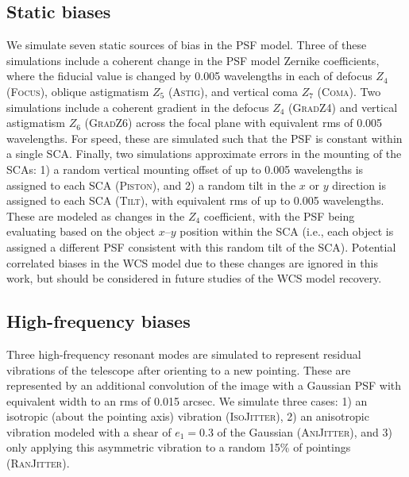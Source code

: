 \documentclass[aps,prd, amsmath,amssymb,superscriptaddress,showkeys,nofootinbib,reprint,preprintnumbers]{revtex4-1}
\begin{document}
\subsection{Static biases}\label{sec:static}

We simulate seven static sources of bias in the PSF model. 
Three of these simulations include a coherent change in the PSF model Zernike coefficients, where the fiducial value is changed by 0.005 wavelengths in each of defocus $Z_4$ (\textsc{Focus}), oblique astigmatism $Z_5$ (\textsc{Astig}), and vertical coma $Z_7$ (\textsc{Coma}). 
Two simulations include a coherent gradient in the defocus $Z_4$ (\textsc{GradZ4}) and vertical astigmatism $Z_6$ (\textsc{GradZ6}) across the focal plane with equivalent rms of 0.005 wavelengths. 
For speed, these are simulated such that the PSF is constant within a single SCA. Finally, two simulations approximate errors in the mounting of the SCAs: 1) a random vertical mounting offset of up to 0.005 wavelengths is assigned to each SCA (\textsc{Piston}), and 2) a random tilt in the $x$ or $y$ direction is assigned to each SCA  (\textsc{Tilt}), with equivalent rms of up to 0.005 wavelengths. 
These are modeled as changes in the $Z_4$ coefficient, with the PSF being evaluating based on the object $x$--$y$ position within the SCA (i.e., each object is assigned a different PSF consistent with this random tilt of the SCA). 
Potential correlated biases in the WCS model due to these changes are ignored in this work, but should be considered in future studies of the WCS model recovery.

\subsection{High-frequency biases}\label{sec:low}

Three high-frequency resonant modes are simulated to represent residual vibrations of the telescope after orienting to a new pointing. 
These are represented by an additional convolution of the image with a Gaussian PSF with equivalent width to an rms of 0.015 arcsec. We simulate three cases: 1) an isotropic (about the pointing axis) vibration  (\textsc{IsoJitter}), 2) an anisotropic vibration modeled with a shear of $e_1=0.3$ of the Gaussian (\textsc{AniJitter}), and 3) only applying this asymmetric vibration to a random 15\% of pointings (\textsc{RanJitter}).
\end{document}
